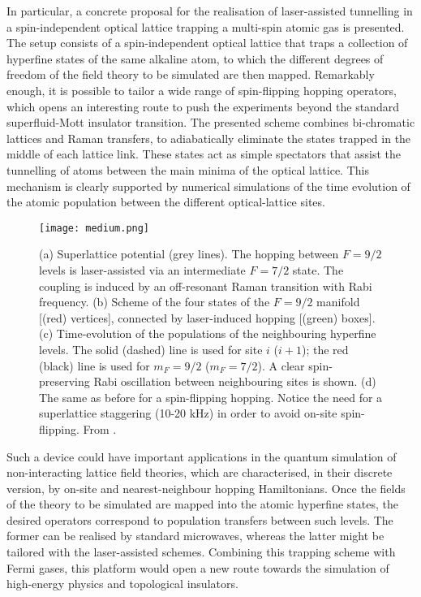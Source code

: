 \documentclass[epj,final]{svjour}
\begin{document}
In particular, a concrete proposal for the realisation of laser-assisted tunnelling in a spin-independent optical lattice trapping a multi-spin atomic gas is presented. The setup consists of a spin-independent optical lattice that traps a collection of hyperfine states of the same alkaline atom, to which the different degrees of freedom of the field theory to be simulated are then mapped. Remarkably enough, it is possible to tailor a wide range of spin-flipping hopping operators, which opens an interesting route to push the experiments beyond the standard superfluid-Mott insulator transition. The presented scheme combines bi-chromatic lattices and Raman transfers, to adiabatically eliminate the states trapped in the middle of each lattice link. These states act as simple spectators that assist the tunnelling of atoms between the main minima of the optical lattice. This mechanism is clearly supported by numerical simulations of the time evolution of the atomic population between the different optical-lattice sites. 

\begin{figure}[h!]
\begin{center}
\texttt{[image: medium.png]} 
\end{center}
\caption{(a) Superlattice potential (grey lines). The hopping between $F=9/2$ levels is laser-assisted via an intermediate $F=7/2$ state. The coupling is induced by an off-resonant Raman transition with Rabi frequency. (b) Scheme of the four states of the $F=9/2$ manifold [(red) vertices], connected by laser-induced hopping [(green) boxes]. (c) Time-evolution of the populations of the neighbouring hyperfine levels. The solid (dashed) line is used for site $i$ ($i+1$); the red (black) line is used for $m_{F}=9/2$ ($m_{F}=7/2$). A clear spin-preserving Rabi oscillation between neighbouring sites is shown. (d) The same as before for a spin-flipping hopping. Notice the need for a superlattice staggering (10-20 kHz) in order to avoid on-site spin-flipping. From \cite{bermudez2010wilson}.}
\end{figure}

Such a device could have important applications in the quantum simulation of non-interacting lattice field theories, which are characterised, in their discrete version, by on-site and nearest-neighbour hopping Hamiltonians. Once the fields of the theory to be simulated are mapped into the atomic hyperfine states, the desired operators correspond to population transfers between such levels. The former can be realised by standard microwaves, whereas the latter might be tailored with the laser-assisted schemes. Combining this trapping scheme with Fermi gases, this platform would open a new route towards the simulation of high-energy physics and topological insulators.
\end{document}
